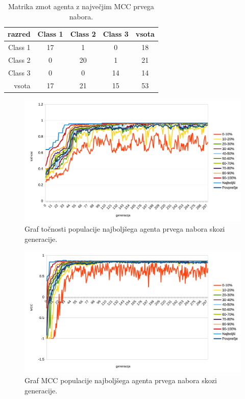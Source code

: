 \begin{table}[H]
    \centering
    \begin{tabular}{||rcccc||}
        \hline
        razred  & Class 1 & Class 2 & Class 3 & vsota \\ \hline
        Class 1 & 17      & 1       & 0       & 18    \\ \hline
        Class 2 & 0       & 20      & 1       & 21    \\ \hline
        Class 3 & 0       & 0       & 14      & 14    \\ \hline
        vsota   & 17      & 21      & 15      & 53    \\ \hline
    \end{tabular}
    \caption{Matrika zmot agenta z največjim MCC prvega nabora.}
    \label{tab:wine_mcc_1}
\end{table}

\begin{figure}[H]
    \begin{center}
        \includegraphics[width=13cm]{wine/1/acc}
    \end{center}
    \caption{Graf točnosti populacije najboljšega agenta prvega nabora skozi generacije.}
    \label{fig:wine_acc_1}
\end{figure}

\begin{figure}[H]
    \begin{center}
        \includegraphics[width=13cm]{wine/1/mcc}
    \end{center}
    \caption{Graf MCC populacije najboljšega agenta prvega nabora skozi generacije.}
    \label{fig:wine_mcc_1}
\end{figure}

